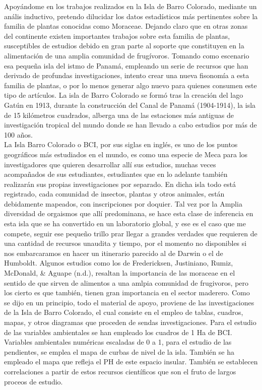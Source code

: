 \documentclass[11pt,]{article}
\begin{document}
Apoyándome en los trabajos realizados en la Isla de Barro Colorado,
mediante un anális inductivo, pretendo dilucidar los datos estadísticos
más pertinentes sobre la familia de plantas conocidas como Moraceae.
Dejando claro que en otras zonas del continente existen importantes
trabajos sobre esta familia de plantas, susceptibles de estudios debido
en gran parte al soporte que constituyen en la alimentación de una
amplia comunidad de frugívoros. Tomando como escenario esa pequeña isla
del istmo de Panamá, empleando un serie de recursos que han derivado de
profundas investigaciones, intento crear una nueva fisonomía a esta
familia de plantas, o por lo menos generar algo nuevo para quienes
consumen este tipo de artículos. La isla de Barro Colorado se formó tras
la creación del lago Gatún en 1913, durante la construcción del Canal de
Panamá (1904-1914), la isla de 15 kilómetros cuadrados, alberga una de
las estaciones más antiguas de investigación tropical del mundo donde se
han llevado a cabo estudios por más de 100 años.\\
La Isla Barro Colorado o BCI, por sus siglas en inglés, es uno de los
puntos geográficos más estudiados en el mundo, es como una especie de
Meca para los investigadores que quieren desarrollar allí sus estudios,
muchas veces acompañados de sus estudiantes, estudiantes que en lo
adelante también realizarán sus propias investigaciones por separado. En
dicha isla todo está registrado, cada comunidad de insectos, plantas y
otros animales, están debidamente mapeados, con inscripciones por
doquier. Tal vez por la Amplia diversidad de orgaismos que allí
predominana, se hace esta clase de inferencia en esta isla que se ha
convertido en un laboratorio global, y ese es el caso que me compete,
seguir ese pequeño trillo prar llegar a grandes verdades que requieren
de una cantidad de recursos unaudita y tiempo, por el momento no
disponibles si nos embarcaramos en hacer un itinerario parecido al de
Darwin o el de Humboldt. Algunos estudios como los de Fredericksen,
Justiniano, Rumiz, McDonald, \& Aguape (n.d.), resaltan la importancia
de las moraceae en el sentido de que sirven de alimentos a una amlpia
comunidad de frugivoros, pero los cierto es que también, tienen gran
importancia en el sector maderero. Como se dijo en un principio, todo el
material de apoyo, proviene de las investigaciones de la Isla de Barro
Colorado, el cual consiste en el empleo de tablas, cuadros, mapas, y
otros diagramas que proceden de sendas investigaciones. Para el estudio
de las variables ambientales se han empleado los cuadros de 1 Ha de BCI.
Variables ambientales numéricas escaladas de 0 a 1, para el estudio de
las pendientes, se emplea el mapa de curbas de nivel de la isla. También
se ha empleado el mapa que refleja el PH de este espacio insular.
También se establecen correlaciones a partir de estos recursos
científicos que son el fruto de largos proceos de estudio.
\end{document}
